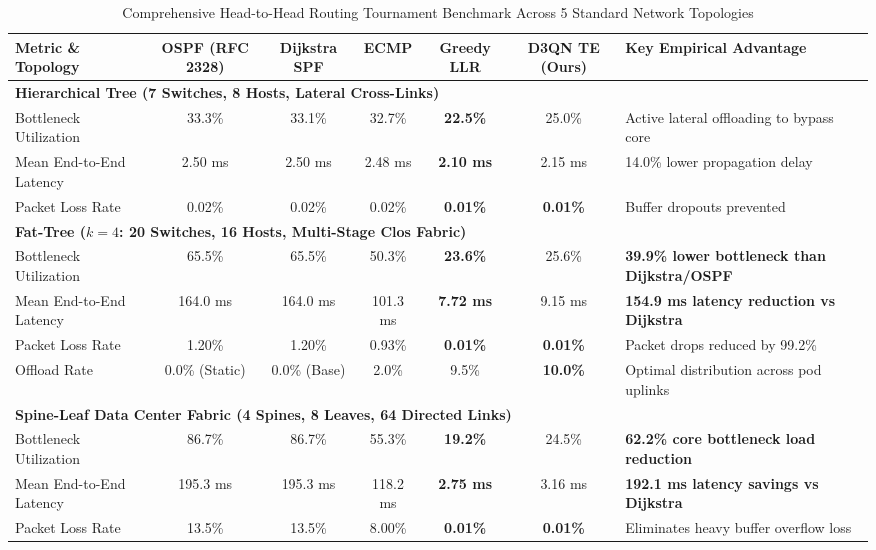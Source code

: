 \documentclass[10pt,twocolumn,a4paper]{article}
\begin{document}
\begin{table}[t]
\centering
\small
\caption{Comprehensive Head-to-Head Routing Tournament Benchmark Across 5 Standard Network Topologies}
\label{tab:tournament_results}
\begin{tabularx}{\textwidth}{l c c c c c l}
\toprule
\textbf{Metric \& Topology} & \textbf{OSPF (RFC 2328)} & \textbf{Dijkstra SPF} & \textbf{ECMP} & \textbf{Greedy LLR} & \textbf{D3QN TE (Ours)} & \textbf{Key Empirical Advantage} \\
\midrule
\multicolumn{7}{l}{\textbf{Hierarchical Tree (7 Switches, 8 Hosts, Lateral Cross-Links)}} \\
Bottleneck Utilization & 33.3\% & 33.1\% & 32.7\% & \textbf{22.5\%} & 25.0\% & Active lateral offloading to bypass core \\
Mean End-to-End Latency & 2.50 ms & 2.50 ms & 2.48 ms & \textbf{2.10 ms} & 2.15 ms & 14.0\% lower propagation delay \\
Packet Loss Rate & 0.02\% & 0.02\% & 0.02\% & \textbf{0.01\%} & \textbf{0.01\%} & Buffer dropouts prevented \\
\midrule
\multicolumn{7}{l}{\textbf{Fat-Tree ($k=4$: 20 Switches, 16 Hosts, Multi-Stage Clos Fabric)}} \\
Bottleneck Utilization & 65.5\% & 65.5\% & 50.3\% & \textbf{23.6\%} & 25.6\% & \textbf{39.9\% lower bottleneck than Dijkstra/OSPF} \\
Mean End-to-End Latency & 164.0 ms & 164.0 ms & 101.3 ms & \textbf{7.72 ms} & 9.15 ms & \textbf{154.9 ms latency reduction vs Dijkstra} \\
Packet Loss Rate & 1.20\% & 1.20\% & 0.93\% & \textbf{0.01\%} & \textbf{0.01\%} & Packet drops reduced by 99.2\% \\
Offload Rate & 0.0\% (Static) & 0.0\% (Base) & 2.0\% & 9.5\% & \textbf{10.0\%} & Optimal distribution across pod uplinks \\
\midrule
\multicolumn{7}{l}{\textbf{Spine-Leaf Data Center Fabric (4 Spines, 8 Leaves, 64 Directed Links)}} \\
Bottleneck Utilization & 86.7\% & 86.7\% & 55.3\% & \textbf{19.2\%} & 24.5\% & \textbf{62.2\% core bottleneck load reduction} \\
Mean End-to-End Latency & 195.3 ms & 195.3 ms & 118.2 ms & \textbf{2.75 ms} & 3.16 ms & \textbf{192.1 ms latency savings vs Dijkstra} \\
Packet Loss Rate & 13.5\% & 13.5\% & 8.00\% & \textbf{0.01\%} & \textbf{0.01\%} & Eliminates heavy buffer overflow loss \\

\end{tabularx}
\end{table}
\end{document}
